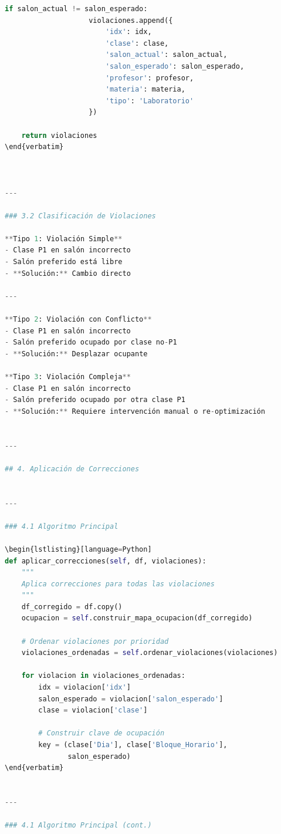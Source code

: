 \begin{itemize}
\begin{itemize}
\begin{itemize}
\begin{itemize}
\begin{itemize}
\begin{itemize}
\begin{enumerate}
\begin{enumerate}
\begin{enumerate}
\begin{enumerate}
\begin{lstlisting}[language=Python]
                if salon_actual != salon_esperado:
                    violaciones.append({
                        'idx': idx,
                        'clase': clase,
                        'salon_actual': salon_actual,
                        'salon_esperado': salon_esperado,
                        'profesor': profesor,
                        'materia': materia,
                        'tipo': 'Laboratorio'
                    })
    
    return violaciones
\end{verbatim}



---

### 3.2 Clasificación de Violaciones

**Tipo 1: Violación Simple**
- Clase P1 en salón incorrecto
- Salón preferido está libre
- **Solución:** Cambio directo

---

**Tipo 2: Violación con Conflicto**
- Clase P1 en salón incorrecto
- Salón preferido ocupado por clase no-P1
- **Solución:** Desplazar ocupante

**Tipo 3: Violación Compleja**
- Clase P1 en salón incorrecto
- Salón preferido ocupado por otra clase P1
- **Solución:** Requiere intervención manual o re-optimización


---

## 4. Aplicación de Correcciones


---

### 4.1 Algoritmo Principal

\begin{lstlisting}[language=Python]
def aplicar_correcciones(self, df, violaciones):
    """
    Aplica correcciones para todas las violaciones
    """
    df_corregido = df.copy()
    ocupacion = self.construir_mapa_ocupacion(df_corregido)
    
    # Ordenar violaciones por prioridad
    violaciones_ordenadas = self.ordenar_violaciones(violaciones)
    
    for violacion in violaciones_ordenadas:
        idx = violacion['idx']
        salon_esperado = violacion['salon_esperado']
        clase = violacion['clase']
        
        # Construir clave de ocupación
        key = (clase['Dia'], clase['Bloque_Horario'], 
               salon_esperado)
\end{verbatim}


---

### 4.1 Algoritmo Principal (cont.)


\end{lstlisting}
\end{enumerate}
\end{enumerate}
\end{enumerate}
\end{enumerate}
\end{itemize}
\end{itemize}
\end{itemize}
\end{itemize}
\end{itemize}
\end{itemize}
